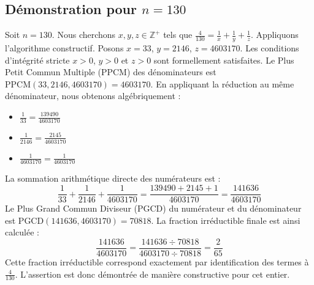 \documentclass[11pt,a4paper]{article}
\begin{document}
\subsection{Démonstration pour $n = 130$}
Soit $n = 130$. Nous cherchons $x, y, z \in \mathbb{Z}^{+}$ tels que $\frac{4}{130} = \frac{1}{x} + \frac{1}{y} + \frac{1}{z}$.
Appliquons l'algorithme constructif. Posons $x = 33$, $y = 2146$, $z = 4603170$.
Les conditions d'intégrité stricte $x > 0$, $y > 0$ et $z > 0$ sont formellement satisfaites.
Le Plus Petit Commun Multiple (PPCM) des dénominateurs est $\text{PPCM}(33, 2146, 4603170) = 4603170$.
En appliquant la réduction au même dénominateur, nous obtenons algébriquement :
\begin{itemize}
    \item $\frac{1}{33} = \frac{139490}{4603170}$
    \item $\frac{1}{2146} = \frac{2145}{4603170}$
    \item $\frac{1}{4603170} = \frac{1}{4603170}$
\end{itemize}
La sommation arithmétique directe des numérateurs est :
$$ \frac{1}{33} + \frac{1}{2146} + \frac{1}{4603170} = \frac{139490 + 2145 + 1}{4603170} = \frac{141636}{4603170} $$
Le Plus Grand Commun Diviseur (PGCD) du numérateur et du dénominateur est $\text{PGCD}(141636, 4603170) = 70818$.
La fraction irréductible finale est ainsi calculée :
$$ \frac{141636}{4603170} = \frac{141636 \div 70818}{4603170 \div 70818} = \frac{2}{65} $$
Cette fraction irréductible correspond exactement par identification des termes à $\frac{4}{130}$. L'assertion est donc démontrée de manière constructive pour cet entier.
\end{document}
